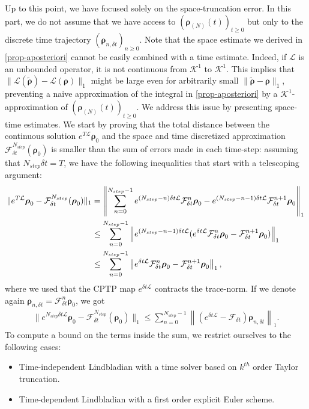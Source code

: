 \documentclass[a4paper,onecolumn,amsmath,amssymb,amsfonts,accepted=2026-03-06]{quantumarticle}
\newcommand{\xL}{\mathcal{L}}
\newcommand{\xF}{\mathcal{F}}
\newcommand{\xK}{\mathcal{K}}
\newcommand{\rN}{{\boldsymbol{\rho}_{(N)}}}
\begin{document}
Up to this point, we have focused solely on the space-truncation error. In this part, we do not assume that we have access to $(\rN(t))_{t\geq0}$ but only to the discrete time trajectory $(\boldsymbol{\rho}_{n,\delta t})_{n\geq 0}$. Note that the space estimate we derived in \cref{prop-aposteriori} cannot be easily combined with a time estimate. Indeed, if $\xL$ is an unbounded operator, it is not continuous from $\xK^1$ to $\xK^1$. This implies that $\|\xL(\tilde{ \boldsymbol{\rho}}) - \xL(\boldsymbol{\rho})\|_1$ might be large even for arbitrarily small $\|\tilde{ \boldsymbol{\rho}} - \boldsymbol{\rho}\|_1$, preventing a naive approximation of the integral in \cref{prop-aposteriori} by a $\xK^1$-approximation of $(\rN(t))_{t\geq0}$. We address this issue by presenting space-time estimates. We start by proving that the total distance between the continuous solution $e^{T\xL}\boldsymbol{\rho}_0$ and the space and time discretized approximation $\xF_{\delta t}^{N_{step}}(\boldsymbol{\rho}_0)$ is smaller than the sum of errors made in each time-step: assuming that $N_{step}\delta t =T$, we have the following inequalities that start with a telescoping argument:
\begin{align}
    \notag \|e^{T\xL}\boldsymbol{\rho}_0- \xF^{N_{step}}_{\delta t}(\boldsymbol{\rho}_0)\|_1 &= \left\|\sum_{n=0}^{N_{step}-1} e^{(N_{step}-n)\delta t \xL} \xF^{n}_{\delta t}\boldsymbol{\rho}_0- e^{(N_{step}-n-1)\delta t \xL} \xF^{n+1}_{\delta t}\boldsymbol{\rho}_0 \right\|_1\\
    \notag &\leq \sum_{n=0}^{N_{step}-1} \left\| e^{(N_{step}-n-1)\delta t \xL} (e^{\delta t \xL} \xF^{n}_{\delta t}\boldsymbol{\rho}_0- \xF^{n+1}_{\delta t}\boldsymbol{\rho}_0) \right\|_1\\
    &\leq \sum_{n=0}^{N_{step}-1} \left\|e^{\delta t \xL} \xF^{n}_{\delta t}\boldsymbol{\rho}_0- \xF^{n+1}_{\delta t}\boldsymbol{\rho}_0 \right\|_1,
\end{align}
where we used that the CPTP map $e^{\delta t \xL}$ contracts the trace-norm.
If we denote again $\boldsymbol{\rho}_{n,\delta t}= \xF_{\delta t}^{n}\boldsymbol{\rho}_0$, we got
\begin{align}
    \label{eq_sum_error_dt}
    \|e^{N_{step}\delta t \xL}\boldsymbol{\rho}_0- \xF^{N_{step}}_{\delta t}(\boldsymbol{\rho}_0)\|_1 \leq \sum_{n=0}^{N_{step}-1} \left\|(e^{\delta t \xL}- \xF_{\delta t})\boldsymbol{\rho}_{n,\delta t}\right\|_1.
\end{align}
To compute a bound on the terms inside the sum, we restrict ourselves to the following cases:
\begin{itemize}
    \item Time-independent Lindbladian with a time solver based on $k^{th}$ order Taylor truncation.
    \item Time-dependent Lindbladian with a first order explicit Euler scheme.
\end{itemize}
\end{document}
